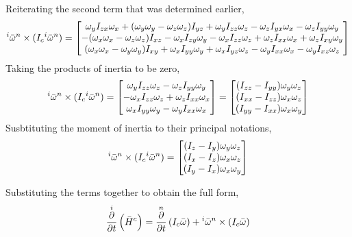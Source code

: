 \documentclass[class=report, 12pt, crop=false]{standalone}
\begin{document}
\begin{center}
Reiterating the second term that was determined earlier,
$${}^i\bar{\omega}^n\times (I_c {}^i\bar{\omega}^n) = \begin{bmatrix}
\omega_yI_{zx}\omega_x + (\omega_y\omega_y - \omega_z\omega_z)I_{yz} + \omega_yI_{zz}\omega_z - \omega_zI_{yx}\omega_x - \omega_zI_{yy}\omega_y \\
-(\omega_x\omega_x - \omega_z\omega_z)I_{xz} - \omega_xI_{zy}\omega_y - \omega_xI_{zz}\omega_z + \omega_zI_{xx}\omega_x + \omega_zI_{xy}\omega_y \\
(\omega_x\omega_x - \omega_y\omega_y)I_{xy} + \omega_xI_{yy}\omega_y + \omega_xI_{yz}\omega_z - \omega_yI_{xx}\omega_x  - \omega_yI_{xz}\omega_z
\end{bmatrix}$$
Taking the products of inertia to be zero,
$${}^i\bar{\omega}^n\times (I_c {}^i\bar{\omega}^n) = \begin{bmatrix}
\omega_yI_{zz}\omega_z - \omega_zI_{yy}\omega_y \\
 - \omega_xI_{zz}\omega_z + \omega_zI_{xx}\omega_x \\
\omega_xI_{yy}\omega_y - \omega_yI_{xx}\omega_x
\end{bmatrix} = \begin{bmatrix}
(I_{zz} - I_{yy})\omega_y\omega_z \\
(I_{xx} - I_{zz})\omega_x\omega_z \\
(I_{yy} - I_{xx})\omega_x\omega_y
\end{bmatrix}$$ 
Susbtituting the moment of inertia to their principal notations,
$${}^i\bar{\omega}^n\times (I_c {}^i\bar{\omega}^n)= \begin{bmatrix}
(I_{z} - I_{y})\omega_y\omega_z \\
(I_{x} - I_{z})\omega_x\omega_z \\
(I_{y} - I_{x})\omega_x\omega_y
\end{bmatrix}$$

Substituting the terms together to obtain the full form,
$$\overset{i}{\frac{\partial}{\partial t}}\left(\bar{H}^c\right) = \overset{n}{\frac{\partial}{\partial t}}\left(I_c \bar{\omega}\right) + {}^i\bar{\omega}^n\times (I_c \bar{\omega})$$


\end{center}
\end{document}
